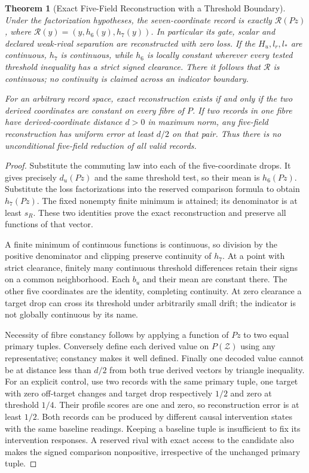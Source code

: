 \documentclass[11pt,a4paper]{article}
\newtheorem{theorem}{Theorem}[section]
\theoremstyle{definition}
\begin{document}
\begin{theorem}[Exact Five-Field Reconstruction with a Threshold Boundary]
\label{thm:five-field-reduction}
Under the factorization hypotheses, the seven-coordinate record is exactly
$\mathcal R(Pz)$, where $\mathcal R(y)=(y,h_6(y),h_7(y))$. In particular
its gate, scalar and declared weak-rival separation are reconstructed with
zero loss. If the $H_u,l_r,l_*$ are continuous, $h_7$ is continuous, while
$h_6$ is locally constant wherever every tested threshold inequality has a
strict signed clearance. There it follows that $\mathcal R$ is continuous;
no continuity is claimed across an indicator boundary.

For an arbitrary record space, exact reconstruction exists if and only if
the two derived coordinates are constant on every fibre of $P$. If two
records in one fibre have derived-coordinate distance $d>0$ in maximum norm,
any five-field reconstruction has uniform error at least $d/2$ on that pair.
Thus there is no unconditional five-field reduction of all valid records.
\end{theorem}
\begin{proof}
Substitute the commuting law into each of the five-coordinate drops. It
gives precisely $d_u(Pz)$ and the same threshold test, so their mean is
$h_6(Pz)$. Substitute the loss factorizations into the reserved comparison
formula to obtain $h_7(Pz)$. The fixed nonempty finite minimum is attained;
its denominator is at least $s_R$. These two identities prove the exact
reconstruction and preserve all functions of that vector.

A finite minimum of continuous functions is continuous, so division by the
positive denominator and clipping preserve continuity of $h_7$. At a point
with strict clearance, finitely many continuous threshold differences retain
their signs on a common neighborhood. Each $b_u$ and their mean are constant
there. The other five coordinates are the identity, completing continuity.
At zero clearance a target drop can cross its threshold under arbitrarily
small drift; the indicator is not globally continuous by its name.

Necessity of fibre constancy follows by applying a function of $Pz$ to two
equal primary tuples. Conversely define each derived value on $P(\mathcal Z)$
using any representative; constancy makes it well defined. Finally one
decoded value cannot be at distance less than $d/2$ from both true derived
vectors by triangle inequality. For an explicit control, use two records
with the same primary tuple, one target with zero off-target changes and
target drop respectively $1/2$ and zero at threshold $1/4$. Their profile
scores are one and zero, so reconstruction error is at least $1/2$.
Both records can be produced by different causal intervention states with
the same baseline readings. Keeping a baseline tuple is insufficient to
fix its intervention responses. A reserved rival with exact access to the
candidate also makes the signed comparison nonpositive, irrespective of
the unchanged primary tuple.
\end{proof}
\end{document}
